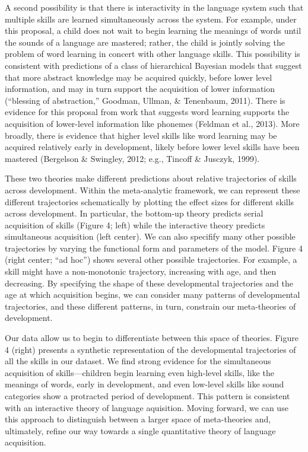 \documentclass[english,floatsintext,man]{apa6}
\begin{document}
A second possibility is that there is interactivity in the language
system such that multiple skills are learned simultaneously across the
system. For example, under this proposal, a child does not wait to begin
learning the meanings of words until the sounds of a language are
mastered; rather, the child is jointly solving the problem of word
learning in concert with other language skills. This possibility is
consistent with predictions of a class of hierarchical Bayesian models
that suggest that more abstract knowledge may be acquired quickly,
before lower level information, and may in turn support the acquisition
of lower information (``blessing of abstraction,'' Goodman, Ullman, \&
Tenenbaum, 2011). There is evidence for this proposal from work that
suggests word learning supports the acquisition of lower-level
information like phonemes (Feldman et al., 2013). More broadly, there is
evidence that higher level skills like word learning may be acquired
relatively early in development, likely before lower level skills have
been mastered (Bergelson \& Swingley, 2012; e.g., Tincoff \& Jusczyk,
1999).

These two theories make different predictions about relative
trajectories of skills across development. Within the meta-analytic
framework, we can represent these different trajectories schematically
by plotting the effect sizes for different skills across development. In
particular, the bottom-up theory predicts serial acquisition of skills
(Figure 4; left) while the interactive theory predicts simultaneous
acquisition (left center). We can also specifify many other possible
trajectories by varying the functional form and parameters of the model.
Figure 4 (right center; \enquote{ad hoc}) shows several other possible
trajectories. For example, a skill might have a non-monotonic
trajectory, increasing with age, and then decreasing. By specifying the
shape of these developmental trajectories and the age at which
acquisition begins, we can consider many patterns of developmental
trajectories, and these different patterns, in turn, constrain our
meta-theories of development.

Our data allow us to begin to differentiate between this space of
theories. Figure 4 (right) presents a synthetic representation of the
developmental trajectories of all the skills in our dataset. We find
strong evidence for the simultaneous acquisition of skills---children
begin learning even high-level skills, like the meanings of words, early
in development, and even low-level skills like sound categories show a
protracted period of development. This pattern is consistent with an
interactive theory of language aquisition. Moving forward, we can use
this approach to distinguish between a larger space of meta-theories
and, ultimately, refine our way towards a single quantitative theory of
language acquisition.
\end{document}

